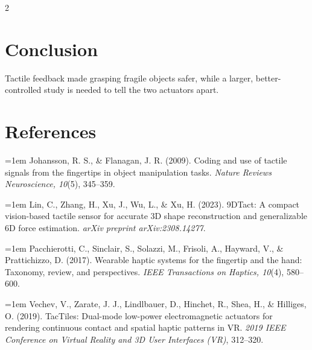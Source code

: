\documentclass[a4paper, 11pt]{article}
\begin{document}
\begin{multicols}{2}
  \section{Conclusion}

  Tactile feedback made grasping fragile objects safer, while a larger, better-controlled
  study is needed to tell the two actuators apart.

  \section{References}

  \begin{scriptsize}
    \noindent\hangindent=1em Johansson, R. S., \& Flanagan, J. R. (2009). Coding and use of
    tactile signals from the fingertips in object manipulation tasks. \textit{Nature Reviews
      Neuroscience, 10}(5), 345--359.

    \noindent\hangindent=1em Lin, C., Zhang, H., Xu, J., Wu, L., \& Xu, H. (2023). 9DTact: A
    compact vision-based tactile sensor for accurate 3D shape reconstruction and generalizable
    6D force estimation. \textit{arXiv preprint arXiv:2308.14277}.

    \noindent\hangindent=1em Pacchierotti, C., Sinclair, S., Solazzi, M., Frisoli, A.,
    Hayward, V., \& Prattichizzo, D. (2017). Wearable haptic systems for the fingertip and the
    hand: Taxonomy, review, and perspectives. \textit{IEEE Transactions on Haptics, 10}(4),
    580--600.

    \noindent\hangindent=1em Vechev, V., Zarate, J. J., Lindlbauer, D., Hinchet, R., Shea, H.,
    \& Hilliges, O. (2019). TacTiles: Dual-mode low-power electromagnetic actuators for
    rendering continuous contact and spatial haptic patterns in VR. \textit{2019 IEEE
      Conference on Virtual Reality and 3D User Interfaces (VR)}, 312--320.

  \end{scriptsize}

\end{multicols}
\end{document}
